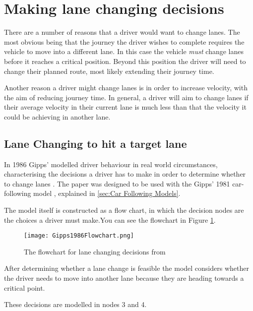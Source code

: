 \section{Making lane changing decisions}
\label{sec:Making lane changing decisions}
There are a number of reasons that a driver would want to change lanes. The most obvious being that the journey the driver wishes to complete requires the vehicle to move into a different lane. In this case the vehicle \emph{must} change lanes before it reaches a critical position. Beyond this position the driver will need to change their planned route, most likely extending their journey time. 

Another reason a driver might change lanes is in order to increase velocity, with the aim of reducing journey time. In general, a driver will aim to change lanes if their average velocity in their current lane is much less than that the velocity it could be achieving in another lane.

\subsection{Lane Changing to hit a target lane}
\label{subsec:Lane Changing to hit a target lane}
In 1986 Gipps' modelled driver behaviour in real world circumstances, characterising the decisions a driver has to make in order to determine whether to change lanes \citep{Gipps1986}. The paper was designed to be used with the Gipps' 1981 car-following model \citep{Gipps1981}, explained in \ref{sec:Car Following Models}.

The model itself is constructed as a flow chart, in which the decision nodes are the choices a driver must make.You can see the flowchart in Figure \ref{fig:Gipps1986Flowchart}.

\begin{figure}[htb]
\texttt{[image: Gipps1986Flowchart.png]}
\caption{The flowchart for lane changing decisions from \citep{Gipps1986}}
\label{fig:Gipps1986Flowchart}
\end{figure}

After determining whether a lane change is feasible the model considers whether the driver needs to move into another lane because they are heading towards a critical point.

These decisions are modelled in nodes 3 and 4.

